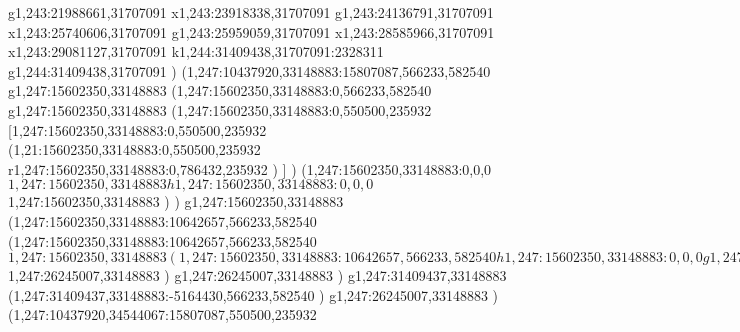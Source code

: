 {g1,243:21988661,31707091
x1,243:23918338,31707091
g1,243:24136791,31707091
x1,243:25740606,31707091
g1,243:25959059,31707091
x1,243:28585966,31707091
x1,243:29081127,31707091
k1,244:31409438,31707091:2328311
g1,244:31409438,31707091
)
(1,247:10437920,33148883:15807087,566233,582540
g1,247:15602350,33148883
(1,247:15602350,33148883:0,566233,582540
g1,247:15602350,33148883
(1,247:15602350,33148883:0,550500,235932
[1,247:15602350,33148883:0,550500,235932
(1,21:15602350,33148883:0,550500,235932
r1,247:15602350,33148883:0,786432,235932
)
]
)
(1,247:15602350,33148883:0,0,0
$1,247:15602350,33148883
h1,247:15602350,33148883:0,0,0
$1,247:15602350,33148883
)
)
g1,247:15602350,33148883
(1,247:15602350,33148883:10642657,566233,582540
(1,247:15602350,33148883:10642657,566233,582540
$1,247:15602350,33148883
(1,247:15602350,33148883:10642657,566233,582540
h1,247:15602350,33148883:0,0,0
g1,247:15711574,33148883
[1,247:15711574,33148883:1092270,437688,582540
(1,247:15711574,33148883:1092270,437688,0
x1,247:16803844,33148883
)
(1,247:15711574,33576686:1092270,318577,89201
k1,247:16104221,33576686:392647
x1,247:16359769,33576686
k1,247:16803844,33576686:392647
)
]
g1,247:16913068,33148883
[1,247:16913068,33148883:1092270,437688,582540
(1,247:16913068,33148883:1092270,437688,0
x1,247:18005338,33148883
)
(1,247:16913068,33576686:1092270,318577,89201
k1,247:17332142,33576686:419074
x1,247:17570621,33576686
k1,247:18005338,33576686:419073
)
]
g1,247:18114562,33148883
x1,247:18609720,33148883
g1,247:18718944,33148883
(1,247:18718944,33148883:3221393,491520,163840
(1,247:18718944,33148883:182045,491520,163840
x1,247:18900989,33148883
)
(1,247:18900989,33148883:2857303,491520,163840
(1,247:18900989,33148883:327681,491520,163840
x1,247:19228670,33148883
)
x1,247:19515391,33148883
x1,247:20343353,33148883
x1,247:20540415,33148883
g1,247:20649639,33148883
x1,247:21030112,33148883
x1,247:21430611,33148883
(1,247:21430611,33148883:327681,491520,163840
x1,247:21758292,33148883
)
)
(1,247:21758292,33148883:182045,491520,163840
x1,247:21940337,33148883
)
)
g1,247:22085969,33148883
x1,247:22595695,33148883
g1,247:22741327,33148883
x1,247:23728694,33148883
x1,247:24126918,33148883
(1,247:24126918,32878290:294003,295640,0
x1,247:24388153,32878290
)
x1,247:24602966,33148883
g1,247:25258327,33148883
g1,247:25367551,33148883
(1,247:25367551,33148883:877456,403098,0
(1,247:25367551,33148883:877456,403098,0
x1,247:26245007,33148883
)
)
)
$1,247:26245007,33148883
)
g1,247:26245007,33148883
)
g1,247:31409437,33148883
(1,247:31409437,33148883:-5164430,566233,582540
)
g1,247:26245007,33148883
)
(1,247:10437920,34544067:15807087,550500,235932
}
